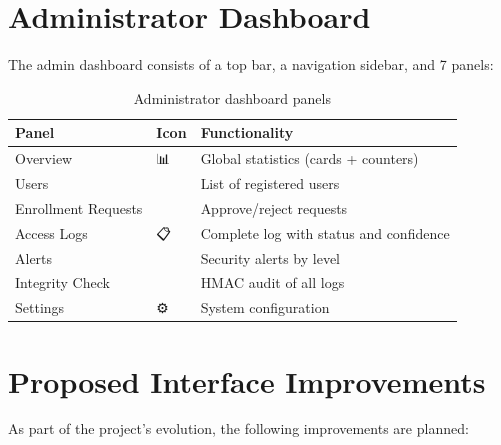 
\section{Administrator Dashboard}

The admin dashboard consists of a top bar, a navigation sidebar, and 7 panels:

\begin{table}[H]
    \centering
    \begin{tabular}{lll}
        \toprule
        \textbf{Panel} & \textbf{Icon} & \textbf{Functionality} \\
        \midrule
        Overview           & 📊 & Global statistics (cards + counters) \\
        Users              & 👥 & List of registered users \\
        Enrollment Requests & 📝 & Approve/reject requests \\
        Access Logs        & 📋 & Complete log with status and confidence \\
        Alerts             & 🚨 & Security alerts by level \\
        Integrity Check    & 🔏 & HMAC audit of all logs \\
        Settings           & ⚙️ & System configuration \\
        \bottomrule
    \end{tabular}
    \caption{Administrator dashboard panels}
\end{table}





\section{Proposed Interface Improvements}

As part of the project's evolution, the following improvements are planned:


